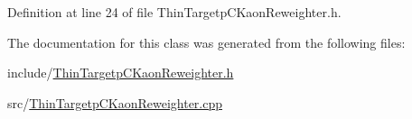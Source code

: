 Definition at line 24 of file Thin\-Targetp\-C\-Kaon\-Reweighter.\-h.



The documentation for this class was generated from the following files\-:\begin{DoxyCompactItemize}
\item 
include/\hyperlink{_thin_targetp_c_kaon_reweighter_8h}{Thin\-Targetp\-C\-Kaon\-Reweighter.\-h}\item 
src/\hyperlink{_thin_targetp_c_kaon_reweighter_8cpp}{Thin\-Targetp\-C\-Kaon\-Reweighter.\-cpp}\end{DoxyCompactItemize}
